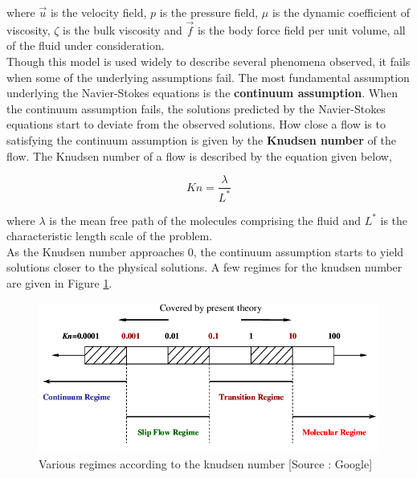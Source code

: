 \noindent where $\vec{u}$ is the velocity field, $p$ is the pressure field, $\mu$ is the dynamic coefficient of viscosity, $\zeta$ is the bulk viscosity and $\vec{f}$ is the body force field per unit volume, all of the fluid under consideration. \\

\noindent Though this model is used widely to describe several phenomena observed, it fails when some of the underlying assumptions fail. The most fundamental assumption underlying the Navier-Stokes equations is the \textbf{continuum assumption}. When the continuum assumption fails, the solutions predicted by the Navier-Stokes equations start to deviate from the observed solutions. How close a flow is to satisfying the continuum assumption is given by the \textbf{Knudsen number} of the flow. The Knudsen number of a flow is described by the equation given below,

\begin{equation} \label{eq:kn}
	Kn = \frac{\lambda}{L^\ast}
\end{equation}

\noindent where $\lambda$ is the mean free path of the molecules comprising the fluid and $L^\ast$ is the characteristic length scale of the problem. \\

\noindent As the Knudsen number approaches 0, the continuum assumption starts to yield solutions closer to the physical solutions. A few regimes for the knudsen number are given in Figure \ref{img:knudsen}.

\begin{figure}[H]
  \includegraphics[scale=0.55]{Pictures/Introduction/Knudsen_Number.png}
  \centering
  \caption{Various regimes according to the knudsen number [Source : Google]} 
  \label{img:knudsen}
\end{figure}

